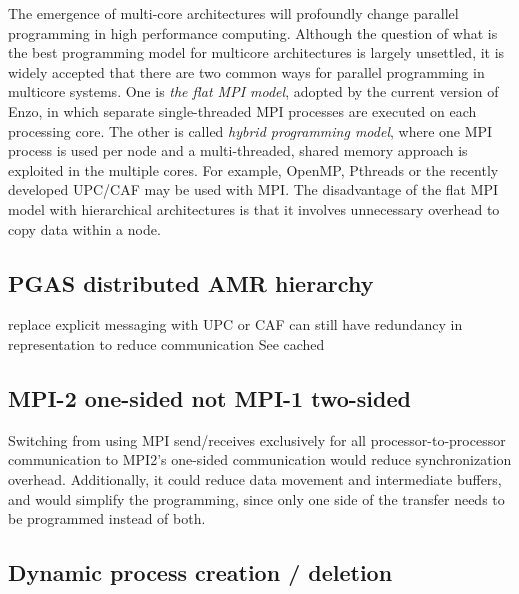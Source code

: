 \documentclass{article}
\begin{document}
  The emergence of multi-core architectures will profoundly change
  parallel programming in high performance computing. Although the
  question of what is the best programming model for multicore
  architectures is largely unsettled, it is widely accepted that there
  are two common ways for parallel programming in multicore systems.
  One is \emph{the flat MPI model}, adopted by the current version of
  Enzo, in which separate single-threaded MPI processes are executed
  on each processing core. The other is called \emph{hybrid
  programming model}, where one MPI process is used per node and a
  multi-threaded, shared memory approach is exploited in the multiple
  cores. For example, OpenMP, Pthreads or the recently developed
  UPC/CAF may be used with MPI.  The disadvantage of the flat MPI
  model with hierarchical architectures is that it involves
  unnecessary overhead to copy data within a node.

\subsection{PGAS distributed AMR hierarchy} \label{solution:parallel-pgas}
   replace explicit messaging with UPC or CAF
   can still have redundancy in representation to reduce communication
   See cached
\subsection{MPI-2 one-sided not MPI-1 two-sided}  \label{solution:parallel-onesided}

  Switching from using MPI send/receives exclusively for all
  processor-to-processor communication to MPI2's one-sided
  communication would reduce synchronization overhead.  Additionally,
  it could reduce data movement and intermediate buffers, and would
  simplify the programming, since only one side of the transfer needs
  to be programmed instead of both.

\subsection{Dynamic process creation / deletion} \label{solution:parallel-dynamic-procs}
\end{document}
